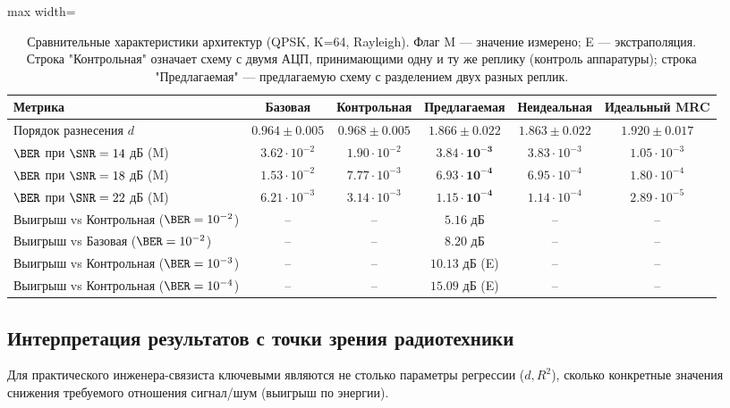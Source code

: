 \documentclass[a4paper,12pt]{article}
\numberwithin{equation}{section}
\begin{document}
\begin{table}[htbp]
\centering
\footnotesize
\caption{Сравнительные характеристики архитектур (QPSK, K=64, Rayleigh). Флаг M — значение измерено; E — экстраполяция. Строка "Контрольная" означает схему с двумя АЦП, принимающими одну и ту же реплику (контроль аппаратуры); строка "Предлагаемая" — предлагаемую схему с разделением двух разных реплик.}
\label{tab:results}
\begin{adjustbox}{max width=\textwidth}
\begin{tabular}{@{}lccccc@{}}
\toprule
\textbf{Метрика} & \textbf{Базовая} & \textbf{Контрольная} & \textbf{Предлагаемая} & \textbf{Неидеальная} & \textbf{Идеальный MRC} \\
\midrule
Порядок разнесения $d$ & $0.964 \pm 0.005$ & $0.968 \pm 0.005$ & $\mathbf{1.866 \pm 0.022}$ & $1.863 \pm 0.022$ & $1.920 \pm 0.017$ \\
$\BER$ при $\SNR=14$ дБ (M) & $3.62 \cdot 10^{-2}$ & $1.90 \cdot 10^{-2}$ & $\mathbf{3.84 \cdot 10^{-3}}$ & $3.83 \cdot 10^{-3}$ & $1.05 \cdot 10^{-3}$ \\
$\BER$ при $\SNR=18$ дБ (M) & $1.53 \cdot 10^{-2}$ & $7.77 \cdot 10^{-3}$ & $\mathbf{6.93 \cdot 10^{-4}}$ & $6.95 \cdot 10^{-4}$ & $1.80 \cdot 10^{-4}$ \\
$\BER$ при $\SNR=22$ дБ (M) & $6.21 \cdot 10^{-3}$ & $3.14 \cdot 10^{-3}$ & $\mathbf{1.15 \cdot 10^{-4}}$ & $1.14 \cdot 10^{-4}$ & $2.89 \cdot 10^{-5}$ \\
\midrule
Выигрыш vs Контрольная ($\BER=10^{-2}$) & -- & -- & $\mathbf{5.16}$ дБ & -- & -- \\
Выигрыш vs Базовая ($\BER=10^{-2}$) & -- & -- & $\mathbf{8.20}$ дБ & -- & -- \\
Выигрыш vs Контрольная ($\BER=10^{-3}$) & -- & -- & $10.13$ дБ (E) & -- & -- \\
Выигрыш vs Контрольная ($\BER=10^{-4}$) & -- & -- & $15.09$ дБ (E) & -- & -- \\
\bottomrule
\end{tabular}
\end{adjustbox}
\end{table}

\subsection{Интерпретация результатов с точки зрения радиотехники}

Для практического инженера-связиста ключевыми являются не столько параметры регрессии ($d, R^2$), сколько конкретные значения снижения требуемого отношения сигнал/шум (выигрыш по энергии).
\end{document}
